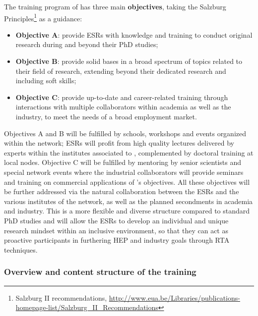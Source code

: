 The training program of \acronym has three main {\bf objectives}, taking the Salzburg Principles\footnote{Salzburg II recommendations, \url{http://www.eua.be/Libraries/publications-homepage-list/Salzburg_II_Recommendations}} as a guidance: 
\begin{itemize}
\item {\bf Objective A}: provide ESRs with knowledge and training to conduct original research during and beyond their PhD studies;
\item {\bf Objective B}: provide solid bases in a broad spectrum of topics related to their field of research, extending beyond their dedicated research and including soft skills; 
\item {\bf Objective C}: provide up-to-date and career-related training through interactions with multiple collaborators within academia as well as the industry, to meet the needs of a broad employment market.
\end{itemize}

Objectives A and B will be fulfilled by schools, workshops and events organized within the network; ESRs will profit from high quality lectures delivered by experts within the institutes associated to \acronym, complemented by doctoral training at local nodes. Objective C will be fulfilled by mentoring by senior scientists and special network events where the industrial collaborators will provide seminars and training on commercial applications of \acronym's objectives. All these objectives will be further addressed via the natural collaboration between the ESRs and the various institutes of the network, as well as the planned secondments in academia and industry. This is a more flexible and diverse structure compared to standard PhD studies and will allow the ESRs to develop an individual and unique research mindset within an inclusive environment, so that they can act as proactive participants in furthering HEP and industry goals through RTA techniques.

\vspace{-2mm}
\subsubsection{Overview and content structure of the training}
\label{sub:overviewTraining}

